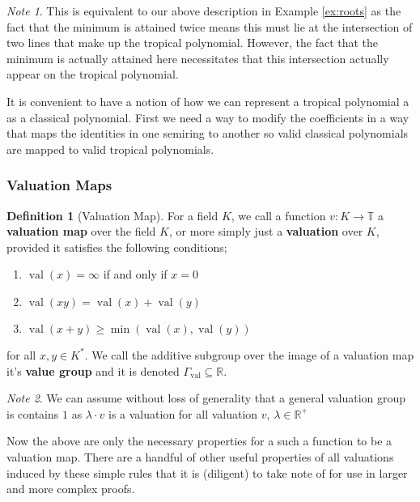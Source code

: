 \documentclass[12pt,a4paper]{amsart}
\newcommand{\val}[1]{\operatorname{val}(#1)}
\newcommand{\Gval}{\Gamma_{\operatorname{val}}}
\newcommand{\R}{\mathbb{R}}
\newcommand{\T}{\mathbb{T}}
\newcommand{\K}{K}
\theoremstyle{definition}
\newtheorem{defn}{Definition}[section]
\theoremstyle{remark}
\newtheorem*{note}{Note}
\begin{document}
\begin{note}
This is equivalent to our above description in Example \ref{ex:roots} as the fact that the minimum is attained twice means this must lie at the intersection of two lines that make up the tropical polynomial. However, the fact that the minimum is actually attained here necessitates that this intersection actually appear on the tropical polynomial.
\end{note}

It is convenient to have a notion of how we can represent a tropical polynomial a as a classical polynomial. First we need a way to modify the coefficients in a way that maps the identities in one semiring to another so valid classical polynomials are mapped to valid tropical polynomials.
\newpage
\subsubsection{Valuation Maps}
\begin{defn}[Valuation Map]
For a field $\K$, we call a function $v:\K\to\T$ a \textbf{valuation map} over the field $\K$, or more simply just a \textbf{valuation} over $\K$, provided it satisfies the following conditions;
\begin{enumerate}
    \item $\val{x} = \infty$ if and only if $x = 0$
    \item $\val{xy} = \val{x} + \val{y}$
    \item $\val{x+y} \geq \min( \val{x},\val{y} )$
\end{enumerate} for all $x,y\in \K^*$.
We call the additive subgroup over the image of a valuation map it's \textbf{value group} and it is denoted $\Gval\subseteq\R$.
\end{defn}

\begin{note}
We can assume without loss of generality that a general valuation group is contains $1$ as $\lambda\cdot v$ is a valuation for all valuation $v$, $\lambda\in\R^+$
\end{note}

Now the above are only the necessary properties for a such a function to be a valuation map. There are a handful of other useful properties of all valuations induced by these simple rules that it is (diligent) to take note of for use in larger and more complex proofs.
\end{document}
